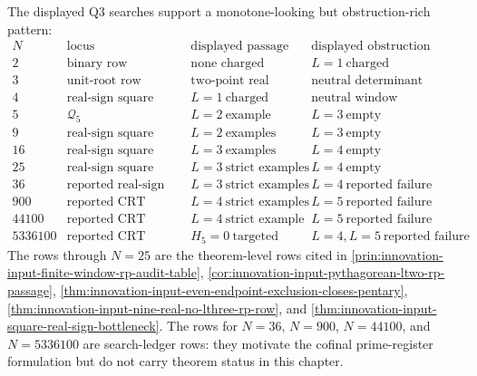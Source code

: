 \begin{principle}
\label{prin:innovation-input-finite-layer-evidence-ledger}
The displayed Q3 searches support a monotone-looking but obstruction-rich
pattern:
$$
\begin{array}{c|c|c|c}
N & \text{locus} & \text{displayed passage} & \text{displayed obstruction}\\
\hline
2 & \text{binary row} & \text{none charged} & L=1\ \text{charged}\\
3 & \text{unit-root row} & \text{two-point real} & \text{neutral determinant}\\
4 & \text{real-sign square} & L=1\ \text{charged} & \text{neutral window}\\
5 & \mathcal Q_5 & L=2\ \text{example} & L=3\ \text{empty}\\
9 & \text{real-sign square} & L=2\ \text{examples} & L=3\ \text{empty}\\
16 & \text{real-sign square} & L=3\ \text{examples} & L=4\ \text{empty}\\
25 & \text{real-sign square} & L=3\ \text{strict examples} & L=4\ \text{empty}\\
36 & \text{reported real-sign square} & L=3\ \text{strict examples} & L=4\ \text{reported failure}\\
900 & \text{reported CRT square} & L=4\ \text{strict examples} & L=5\ \text{reported failure}\\
44100 & \text{reported CRT square} & L=4\ \text{strict example} & L=5\ \text{reported failure}\\
5336100 & \text{reported CRT square} & H_5=0\ \text{targeted} & L=4,L=5\ \text{reported failure}
\end{array}
$$
The rows through $N=25$ are the theorem-level rows cited in
\autoref{prin:innovation-input-finite-window-rp-audit-table},
\autoref{cor:innovation-input-pythagorean-ltwo-rp-passage},
\autoref{thm:innovation-input-even-endpoint-exclusion-closes-pentary},
\autoref{thm:innovation-input-nine-real-no-lthree-rp-row}, and
\autoref{thm:innovation-input-square-real-sign-bottleneck}. The rows for
$N=36$, $N=900$, $N=44100$, and $N=5336100$ are search-ledger rows: they
motivate the cofinal prime-register formulation but do not carry theorem
status in this chapter.
\end{principle}

